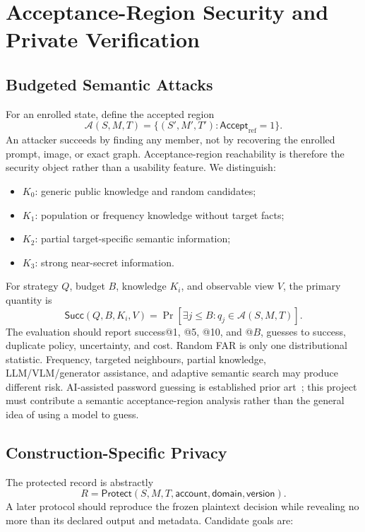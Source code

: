 \documentclass[compsoc,conference,a4paper,10pt,times]{IEEEtran}
\begin{document}
\section{Acceptance-Region Security and Private Verification}
\label{sec:security}
\subsection{Budgeted Semantic Attacks}
For an enrolled state, define the accepted region
\begin{equation}
  \mathcal{A}(S,M,T)=\{(S',M',T'): \mathsf{Accept}_{\mathrm{ref}}=1\}.
\end{equation}
An attacker succeeds by finding any member, not by recovering the enrolled prompt, image, or exact graph. Acceptance-region reachability is therefore the security object rather than a usability feature. We distinguish:

\begin{itemize}[leftmargin=*]
  \item $K_0$: generic public knowledge and random candidates;
  \item $K_1$: population or frequency knowledge without target facts;
  \item $K_2$: partial target-specific semantic information;
  \item $K_3$: strong near-secret information.
\end{itemize}

For strategy $Q$, budget $B$, knowledge $K_i$, and observable view $V$, the primary quantity is
\begin{equation}
  \mathsf{Succ}(Q,B,K_i,V)=
  \Pr[\exists j\leq B: q_j\in\mathcal{A}(S,M,T)].
\end{equation}
The evaluation should report success@1, @5, @10, and @$B$, guesses to success, duplicate policy, uncertainty, and cost. Random FAR is only one distributional statistic. Frequency, targeted neighbours, partial knowledge, LLM/VLM/generator assistance, and adaptive semantic search may produce different risk. AI-assisted password guessing is established prior art~\cite{Rando2023PassGPT}; this project must contribute a semantic acceptance-region analysis rather than the general idea of using a model to guess.

\subsection{Construction-Specific Privacy}
The protected record is abstractly
\begin{equation}
  R=\mathsf{Protect}(S,M,T,\mathsf{account},\mathsf{domain},\mathsf{version}).
\end{equation}
A later protocol should reproduce the frozen plaintext decision while revealing no more than its declared output and metadata. Candidate goals are:
\end{document}
